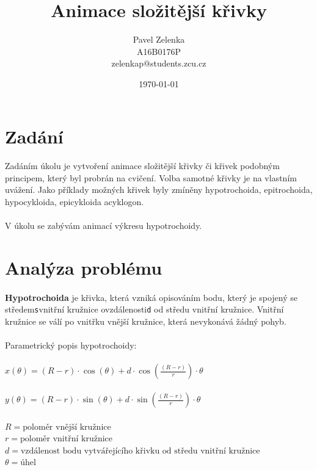 \documentclass[12pt]{scrartcl}
\author{Pavel Zelenka\\A16B0176P\\zelenkap@students.zcu.cz}
\date{\today}
\title{Animace složitější křivky}
\begin{document}
\maketitle
{}
\newpage
{}
\newpage
\section{Zadání}
	
\paragraph{}
Zadáním úkolu je vytvoření animace složitější křivky či křivek podobným principem, který
byl probrán na cvičení.
Volba samotné křivky je na vlastním uvážení. Jako příklady možných křivek byly zmíněny hypotrochoida, epitrochoida, hypocykloida, epicykloida a\nobreakspace cyklogon.

\paragraph{}
V úkolu se zabývám animací výkresu hypotrochoidy.

\section{Analýza problému}

\paragraph{}
\textbf{Hypotrochoida} je křivka, která vzniká opisováním bodu, který je spojený se středem\nobreakspace \texttt{s}\nobreakspace vnitřní kružnice o\nobreakspace vzdálenosti\nobreakspace \texttt{d} od středu vnitřní kružnice. Vnitřní kružnice se válí po vnitřku vnější kružnice, která nevykonává žádný pohyb.\\\\
Parametrický popis hypotrochoidy: \\ \\
$ x(\theta) = (R - r) \cdot \cos(\theta) + d \cdot \cos(\frac{(R - r)}{r}) \cdot \theta $ \\ \\
$ y(\theta) = (R - r) \cdot \sin(\theta) + d \cdot \sin(\frac{(R - r)}{r}) \cdot \theta $ \\ \\
$ R = \text{poloměr vnější kružnice} $ \\
$ r = \text{poloměr vnitřní kružnice} $ \\
$ d = \text{vzdálenost bodu vytvářejícího křivku od středu vnitřní kružnice} $ \\
$ \theta = \text{úhel} $ 
\end{document}
